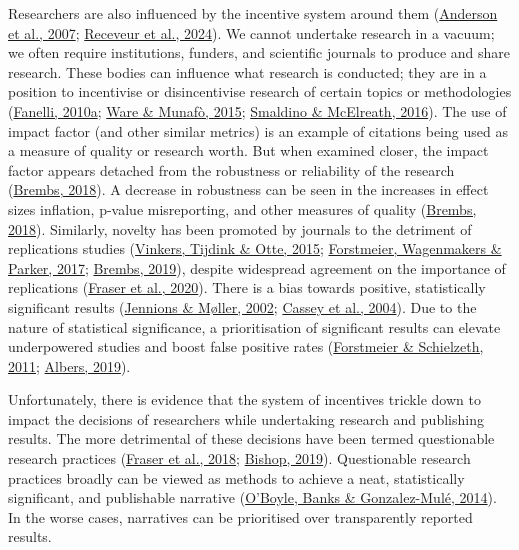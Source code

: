 \documentclass[10pt,a4paper]{article}
\begin{document}
Researchers are also influenced by the incentive system around them (\protect\hyperlink{ref-anderson_perverse_2007}{Anderson et al., 2007}; \protect\hyperlink{ref-receveur_david_2024}{Receveur et al., 2024}).
We cannot undertake research in a vacuum; we often require institutions, funders, and scientific journals to produce and share research.
These bodies can influence what research is conducted; they are in a position to incentivise or disincentivise research of certain topics or methodologies (\protect\hyperlink{ref-fanelli_pressures_2010}{Fanelli, 2010a}; \protect\hyperlink{ref-ware_significance_2015}{Ware \& Munafò, 2015}; \protect\hyperlink{ref-smaldino_natural_2016}{Smaldino \& McElreath, 2016}).
The use of impact factor (and other similar metrics) is an example of citations being used as a measure of quality or research worth.
But when examined closer, the impact factor appears detached from the robustness or reliability of the research (\protect\hyperlink{ref-Brembs2018}{Brembs, 2018}).
A decrease in robustness can be seen in the increases in effect sizes inflation, p-value misreporting, and other measures of quality (\protect\hyperlink{ref-Brembs2018}{Brembs, 2018}).
Similarly, novelty has been promoted by journals to the detriment of replications studies (\protect\hyperlink{ref-vinkers_use_2015}{Vinkers, Tijdink \& Otte, 2015}; \protect\hyperlink{ref-forstmeier_detecting_2017}{Forstmeier, Wagenmakers \& Parker, 2017}; \protect\hyperlink{ref-brembs_reliable_2019}{Brembs, 2019}), despite widespread agreement on the importance of replications (\protect\hyperlink{ref-fraser_role_2020}{Fraser et al., 2020}).
There is a bias towards positive, statistically significant results (\protect\hyperlink{ref-jennions_publication_2002}{Jennions \& Møller, 2002}; \protect\hyperlink{ref-cassey_survey_2004}{Cassey et al., 2004}).
Due to the nature of statistical significance, a prioritisation of significant results can elevate underpowered studies and boost false positive rates (\protect\hyperlink{ref-forstmeier_cryptic_2011}{Forstmeier \& Schielzeth, 2011}; \protect\hyperlink{ref-albers_problem_2019}{Albers, 2019}).

Unfortunately, there is evidence that the system of incentives trickle down to impact the decisions of researchers while undertaking research and publishing results.
The more detrimental of these decisions have been termed questionable research practices (\protect\hyperlink{ref-fraser_questionable_2018}{Fraser et al., 2018}; \protect\hyperlink{ref-bishop_rein_2019}{Bishop, 2019}).
Questionable research practices broadly can be viewed as methods to achieve a neat, statistically significant, and publishable narrative (\protect\hyperlink{ref-oboyle_chrysalis_2014}{O'Boyle, Banks \& Gonzalez-Mulé, 2014}).
In the worse cases, narratives can be prioritised over transparently reported results.
\end{document}
